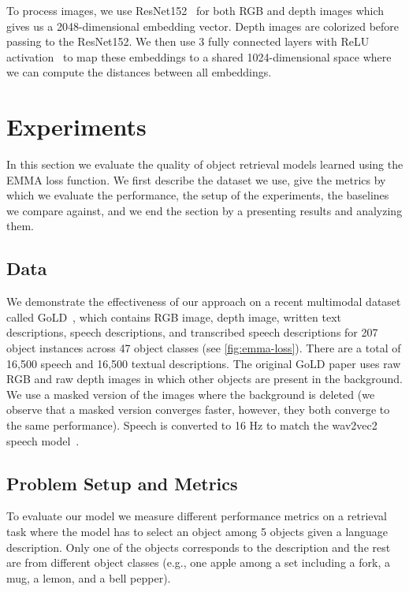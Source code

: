 \documentclass[sigconf,natbib=true,anonymous=true]{acmart}
\begin{document}
To process images, we use ResNet152~\cite{He_resnet_2016} for both RGB and depth images which gives us a 2048-dimensional embedding vector. Depth images are colorized before passing to the ResNet152.
We then use 3 fully connected layers with ReLU activation~\cite{relu2010} to map these embeddings to a shared 1024-dimensional space where we can compute the distances between all embeddings.






\section{Experiments}
\label{sec:Experiments}

In this section we evaluate the quality of object retrieval models learned using the EMMA loss function. We first describe the dataset we use, give the metrics by which we evaluate the performance, the setup of the experiments, the baselines we compare against, and we end the section by a presenting results and analyzing them.

\subsection{Data}
\label{sec:Data}

We demonstrate the effectiveness of our approach on a recent multimodal dataset called GoLD~\cite{GoLD_UMBC}, which contains RGB image, depth image, written text descriptions, speech descriptions, and transcribed speech descriptions for 207 object instances across 47 object classes (see \cref{fig:emma-loss}). There are a total of 16,500 speech and 16,500 textual descriptions. The original GoLD paper uses raw RGB and raw depth images in which other objects are present in the background. We use a masked version of the images where the background is deleted (we observe that a masked version converges faster, however, they both converge to the same performance). Speech is converted to 16 Hz to match the wav2vec2 speech model~\cite{wav2vec2}.


\subsection{Problem Setup and Metrics}
\label{sec:metrics}
To evaluate our model we measure different performance metrics on a retrieval task where the model has to select an object among 5 objects given a language description. Only one of the objects corresponds to the description and the rest are from different object classes (e.g., one apple among a set including a fork, a mug, a lemon, and a bell pepper).
\end{document}
